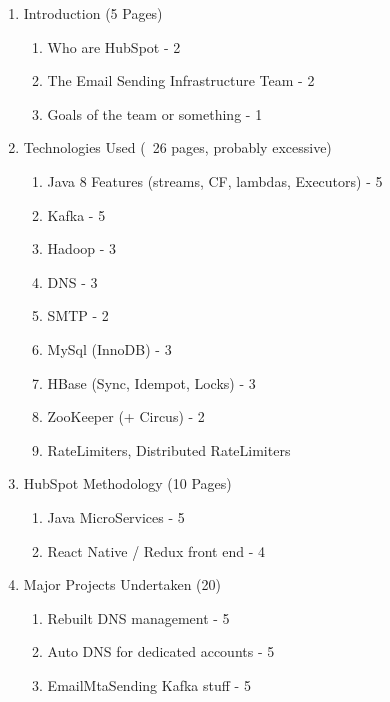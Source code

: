 

\begin{enumerate}
	\item Introduction (5 Pages)
	\begin{enumerate}
    	\item Who are HubSpot - 2
        \item The Email Sending Infrastructure Team - 2
        \item Goals of the team or something - 1
    \end{enumerate}
    
    \item Technologies Used (~26 pages, probably excessive)
    \begin{enumerate}
    	\item Java 8 Features (streams, CF, lambdas, Executors) - 5
        \item Kafka - 5
        \item Hadoop - 3
        \item DNS - 3
        \item SMTP - 2
        \item MySql (InnoDB) - 3
        \item HBase (Sync, Idempot, Locks) - 3
        \item ZooKeeper (+ Circus) - 2
        \item RateLimiters, Distributed RateLimiters
    \end{enumerate}
    
    \item HubSpot Methodology (10 Pages)
    \begin{enumerate}
    	\item Java MicroServices - 5
        \item React Native / Redux front end - 4
    \end{enumerate}
    
    \item Major Projects Undertaken (20)
    \begin{enumerate}
    	\item Rebuilt DNS management - 5
        \item Auto DNS for dedicated accounts - 5
    	\item EmailMtaSending Kafka stuff - 5
    \end{enumerate}
    
\end{enumerate}
